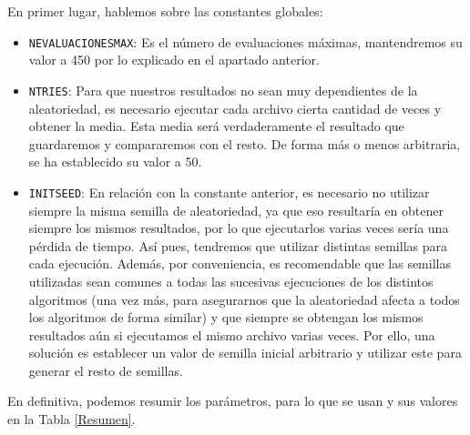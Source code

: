En primer lugar, hablemos sobre las constantes globales:
\begin{itemize}
	\item \texttt{NEVALUACIONESMAX}: Es el número de evaluaciones máximas, mantendremos su valor a 450 por lo explicado en el apartado anterior. 
	\item \texttt{NTRIES}: Para que nuestros resultados no sean muy dependientes de la aleatoriedad, es necesario ejecutar cada archivo cierta cantidad de veces y obtener la media. 
Esta media será verdaderamente el resultado que guardaremos y compararemos con el resto. 
De forma más o menos arbitraria, se ha establecido su valor a 50.
	\item \texttt{INITSEED}: En relación con la constante anterior, es necesario no utilizar siempre la misma semilla de aleatoriedad, ya que eso resultaría en obtener siempre los mismos resultados, por lo que ejecutarlos varias veces sería una pérdida de tiempo. 
Así pues, tendremos que utilizar distintas semillas para cada ejecución. 
Además, por conveniencia, es recomendable que las semillas utilizadas sean comunes a todas las sucesivas ejecuciones de los distintos algoritmos (una vez más, para asegurarnos que la aleatoriedad afecta a todos los algoritmos de forma similar) y que siempre se obtengan los mismos resultados aún si ejecutamos el mismo archivo varias veces. 
Por ello, una solución es establecer un valor de semilla inicial arbitrario y utilizar este para generar el resto de semillas.
\end{itemize}

En definitiva, podemos resumir los parámetros, para lo que se usan y sus valores en la Tabla \ref{Resumen}.

